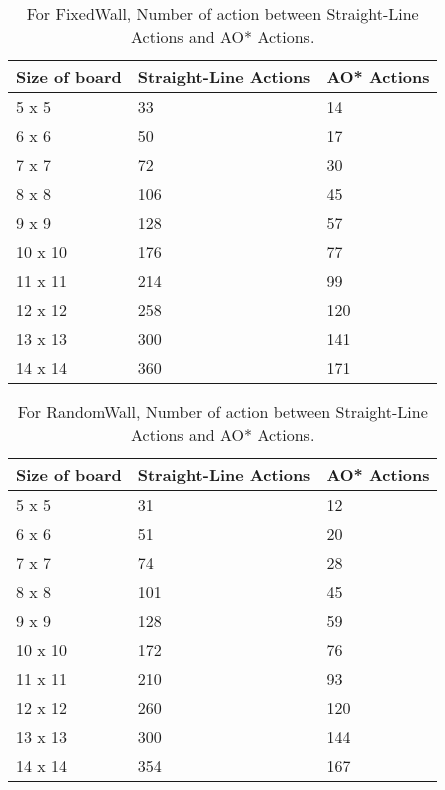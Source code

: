 \documentclass{article}
\begin{document}
\begin{table}[h]\centering
  \begin{tabular}{lll}
    \toprule
    Size of board& Straight-Line Actions & AO{*} Actions\\
    \midrule
    5 x 5& 33 & 14\\
    \midrule
    6 x 6& 50&17\\
    \midrule
    7 x 7& 72&30\\
    \midrule
    8 x 8&106&45\\
    \midrule
    9 x 9& 128&57\\
    \midrule
    10 x 10& 176& 77\\
    \midrule
    11 x 11& 214& 99\\
    \midrule
    12 x 12& 258& 120\\
    \midrule
    13 x 13& 300& 141\\
    \midrule
    14 x 14& 360& 171\\
     
    \bottomrule
  \end{tabular}
  \caption{For FixedWall, Number of action between Straight-Line Actions and AO{*} Actions. }
  \label{tab:resultsEasy}
\end{table}
 
\begin{table}[h]\centering
  \begin{tabular}{lll}
    \toprule
    Size of board& Straight-Line Actions & AO{*} Actions\\
    \midrule
    5 x 5& 31 & 12\\
    \midrule
    6 x 6& 51&20\\
    \midrule
    7 x 7& 74&28\\
    \midrule
    8 x 8&101&45\\
    \midrule
    9 x 9& 128&59\\
    \midrule
    10 x 10& 172& 76\\
    \midrule
    11 x 11& 210& 93\\
    \midrule
    12 x 12& 260& 120\\
    \midrule
    13 x 13& 300& 144\\
    \midrule
    14 x 14& 354& 167\\
     
    \bottomrule
  \end{tabular}
  \caption{For RandomWall, Number of action between Straight-Line Actions and AO{*} Actions. }
  \label{tab:resultsEasy}
\end{table} 
\end{document}
